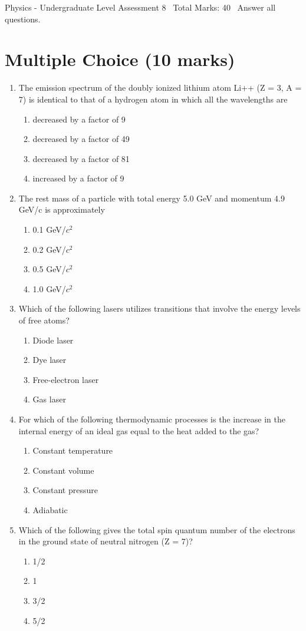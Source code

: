 \documentclass[12pt]{article}
\begin{document}
\begin{center}
Physics - Undergraduate Level Assessment 8 \
Total Marks: 40 \
Answer all questions.
\end{center}

\section*{Multiple Choice (10 marks)}
\begin{enumerate}[label=\arabic*.]
\item The emission spectrum of the doubly ionized lithium atom Li++ (Z = 3, A = 7) is identical to that of a hydrogen atom in which all the wavelengths are
\begin{enumerate}[label=(\alph*)]
    \item decreased by a factor of 9
    \item decreased by a factor of 49
    \item decreased by a factor of 81
    \item increased by a factor of 9
\end{enumerate}
\item The rest mass of a particle with total energy 5.0 GeV and momentum 4.9 GeV/c is approximately
\begin{enumerate}[label=(\alph*)]
    \item 0.1 GeV/$c^2$
    \item 0.2 GeV/$c^2$
    \item 0.5 GeV/$c^2$
    \item 1.0 GeV/$c^2$
\end{enumerate}
\item Which of the following lasers utilizes transitions that involve the energy levels of free atoms?
\begin{enumerate}[label=(\alph*)]
    \item Diode laser
    \item Dye laser
    \item Free-electron laser
    \item Gas laser
\end{enumerate}
\item For which of the following thermodynamic processes is the increase in the internal energy of an ideal gas equal to the heat added to the gas?
\begin{enumerate}[label=(\alph*)]
    \item Constant temperature
    \item Constant volume
    \item Constant pressure
    \item Adiabatic
\end{enumerate}
\item Which of the following gives the total spin quantum number of the electrons in the ground state of neutral nitrogen (Z = 7)?
\begin{enumerate}[label=(\alph*)]
    \item 1/2
    \item 1
    \item 3/2
    \item 5/2
\end{enumerate}
\end{enumerate}
\end{document}

